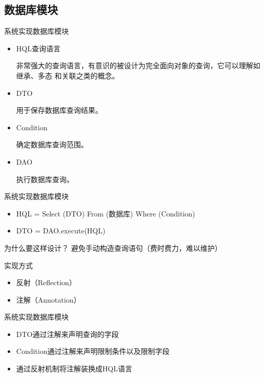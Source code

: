\documentclass{beamer}
\begin{document}
\subsection{数据库模块}
\begin{frame}{系统实现}{数据库模块}
\begin{itemize}
	\item HQL查询语言

非常强大的查询语言，有意识的被设计为完全面向对象的查询，它可以理解如继承、多态 和关联之类的概念。

	\item DTO

用于保存数据库查询结果。

	\item Condition

确定数据库查询范围。

	\item DAO

执行数据库查询。
\end{itemize}
\end{frame}

\begin{frame}{系统实现}{数据库模块}
\begin{itemize}
	\item HQL = Select (DTO) From (数据库) Where (Condition)
	\item DTO = DAO.execute(HQL)
\end{itemize}
\pause
\begin{alertblock}{为什么要这样设计？}
避免手动构造查询语句（费时费力，难以维护）
\end{alertblock}
\pause
\begin{alertblock}{实现方式}
\begin{itemize}
	\item 反射（Reflection）
	\item 注解（Annotation）
\end{itemize}
\end{alertblock}
\end{frame}

\begin{frame}{系统实现}{数据库模块}
\begin{itemize}
	\item DTO通过注解来声明查询的字段
	\item Condition通过注解来声明限制条件以及限制字段
	\item 通过反射机制将注解装换成HQL语言
\end{itemize}
\end{frame}
\end{document}
